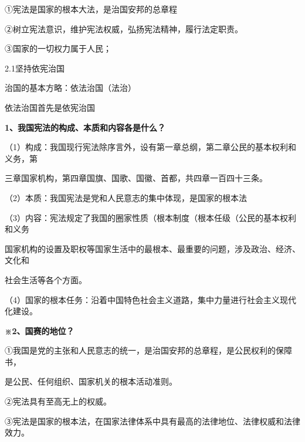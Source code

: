 \documentclass[lang=cn,11pt]{elegantbook}
\newcommand{\daofasym}[1]{{\daofasymbolfont #1}}
\newcommand{\daofasym}[1]{#1}
\begin{document}
\daofasym{①}宪法是国家的根本大法，是治国安邦的总章程\par

\daofasym{②}树立宪法意识，维护宪法权威，弘扬宪法精神，履行法定职责。\par

\daofasym{③}国家的一切权力属于人民；\par

2.1坚持依宪治国\par

治国的基本方略：依法治国（法治）\par

依法治国首先是依宪治国\par

\textbf{1、我国宪法的构成、本质和内容各是什么？}\par

（1）构成：我国现行宪法除序言外，设有第一章总纲，第二章公民的基本权利和义务，第\par

三章国家机构，第四章国旗、国歌、国徽、首都，共四章一百四十三条。\par

（2）本质：我国宪法是党和人民意志的集中体现，是国家的根本法\par

（3）内容：宪法规定了我国的圈家性质（根本制度（根本任级（公民的基本权利和义务\par

国家机构的设置及职权等国家生活中的最根本、最重要的问题，涉及政治、经济、文化和\par

社会生活等各个方面。\par

（4）国家的根本任务：沿着中国特色社会主义道路，集中力量进行社会主义现代化建设。\par

\textbf{※2、国赛的地位？}\par

\daofasym{①}我国是党的主张和人民意志的统一，是治国安邦的总章程，是公民权利的保障书，\par

是公民、任何组织、国家机关的根本活动准则。\par

\daofasym{②}宪法具有至高无上的权威。\par

\daofasym{③}宪法是国家的根本法，在国家法律体系中具有最高的法律地位、法律权威和法律效力。\par
\end{document}
